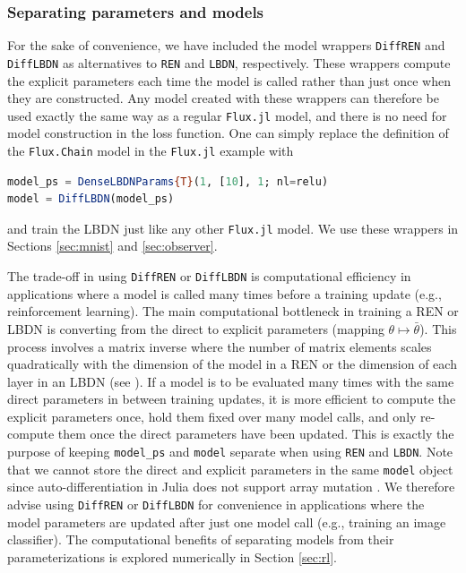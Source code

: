 \subsubsection{Separating parameters and models} \label{sec:separate-params}

For the sake of convenience, we have included the model wrappers \verb|DiffREN| and \verb|DiffLBDN| as alternatives to \verb|REN| and \verb|LBDN|, respectively. These wrappers compute the explicit parameters each time the model is called rather than just once when they are constructed. Any model created with these wrappers can therefore be used exactly the same way as a regular \verb|Flux.jl| model, and there is no need for model construction in the loss function. One can simply replace the definition of the \verb|Flux.Chain| model in the \verb|Flux.jl| example with
\begin{lstlisting}[language = Julia]
model_ps = DenseLBDNParams{T}(1, [10], 1; nl=relu)
model = DiffLBDN(model_ps)
\end{lstlisting}
and train the LBDN just like any other \verb|Flux.jl| model. We use these wrappers in Sections \ref{sec:mnist} and \ref{sec:observer}.

The trade-off in using \verb|DiffREN| or \verb|DiffLBDN| is computational efficiency in applications where a model is called many times before a training update (e.g., reinforcement learning). The main computational bottleneck in training a REN or LBDN is converting from the direct to explicit parameters (mapping $\theta \mapsto \bar{\theta}$). This process involves a matrix inverse where the number of matrix elements scales quadratically with the dimension of the model in a REN or the dimension of each layer in an LBDN (see \cite{Revay++2023,Wang+Manchester2023}). If a model is to be evaluated many times with the same direct parameters in between training updates, it is more efficient to compute the explicit parameters once, hold them fixed over many model calls, and only re-compute them once the direct parameters have been updated. This is exactly the purpose of keeping \verb|model_ps| and \verb|model| separate when using \verb|REN| and \verb|LBDN|. Note that we cannot store the direct and explicit parameters in the same \verb|model| object since auto-differentiation in Julia does not support array mutation \cite{Innes2018b}. We therefore advise using \verb|DiffREN| or \verb|DiffLBDN| for convenience in applications where the model parameters are updated after just one model call (e.g., training an image classifier). The computational benefits of separating models from their parameterizations is explored numerically in Section \ref{sec:rl}.
